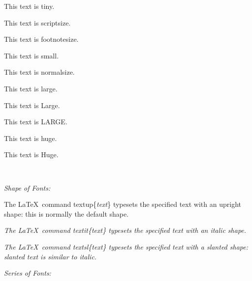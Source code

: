 \documentclass[12pt]{article}
\begin{document}
\begin{tiny}This text is tiny.\end{tiny}

\begin{scriptsize}This text is scriptsize.\end{scriptsize}

\begin{footnotesize}This text is footnotesize.\end{footnotesize}

\begin{small}This text is small.\end{small}

\begin{normalsize}This text is normalsize.\end{normalsize}

\begin{large}This text is large.\end{large}

\begin{Large}This text is Large.\end{Large}

\begin{LARGE}This text is LARGE.\end{LARGE}

\begin{huge}This text is huge.\end{huge}

\begin{Huge}This text is Huge.\end{Huge} \\

\noindent
\begin{large}\textit{Shape of Fonts:}\end{large}

\textup{The \LaTeX\ command \texttt{\textup{}}textup\{\textit{text}\} typesets the specified text with an upright shape: this is normally the default shape.}

\textit{The \LaTeX\ command \texttt{\textup{}}\textup{textit}\{text\} typesets the specified text with an italic shape.}

\textsl{The \LaTeX\ command \texttt{\textup{}}\textup{textsl}\{\textit{text}\} typesets the specified text with a slanted shape: slanted text is similar to italic.} \\

\noindent
\begin{large}\textit{Series of Fonts:}\end{large}
\end{document}
